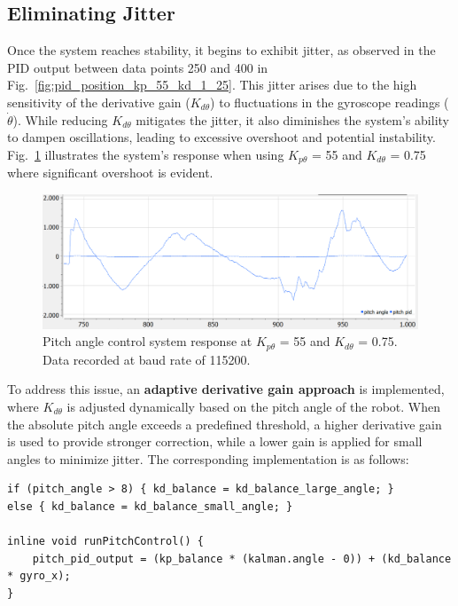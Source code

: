 \subsection{Eliminating Jitter}
Once the system reaches stability, it begins to exhibit jitter, as observed in the PID output between data points 250 and 400 in Fig.~\ref{fig:pid_position_kp_55_kd_1_25}. This jitter arises due to the high sensitivity of the derivative gain ($K_{d\theta}$) to fluctuations in the gyroscope readings ($\dot{\theta}$). While reducing $K_{d\theta}$ mitigates the jitter, it also diminishes the system's ability to dampen oscillations, leading to excessive overshoot and potential instability. Fig.~\ref{fig:pid_position_overshoot} illustrates the system's response when using $K_{p\theta}$ = 55 and $K_{d\theta}$ = 0.75 where significant overshoot is evident.

\begin{figure}[H]
	\centering
	\includegraphics[width=0.8\linewidth]{assets/pid_pitch_overshoot.png}
	\caption{Pitch angle control system response at $K_{p\theta}$ = 55 and $K_{d\theta}$ = 0.75. Data recorded at baud rate of 115200.}
	\label{fig:pid_position_overshoot}
\end{figure}

To address this issue, an \textbf{adaptive derivative gain approach} is implemented, where $K_{d\theta}$ is adjusted dynamically based on the pitch angle of the robot. When the absolute pitch angle exceeds a predefined threshold, a higher derivative gain is used to provide stronger correction, while a lower gain is applied for small angles to minimize jitter. The corresponding implementation is as follows:
\begin{lstlisting}[style=cppstyle2]
if (pitch_angle > 8) { kd_balance = kd_balance_large_angle; }
else { kd_balance = kd_balance_small_angle; }

inline void runPitchControl() {
	pitch_pid_output = (kp_balance * (kalman.angle - 0)) + (kd_balance * gyro_x);
}
\end{lstlisting}

